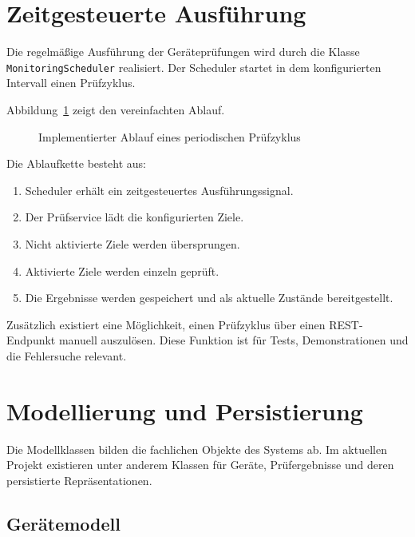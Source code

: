\section{Zeitgesteuerte Ausführung}
\label{sec:zeitgesteuerte-ausfuehrung}

Die regelmäßige Ausführung der Geräteprüfungen wird durch die Klasse \texttt{MonitoringScheduler} realisiert. Der Scheduler startet in dem konfigurierten Intervall einen Prüfzyklus.

Abbildung~\ref{fig:pruefzyklus-implementierung} zeigt den vereinfachten Ablauf.

\begin{figure}[htbp]
    \centering
    \caption{Implementierter Ablauf eines periodischen Prüfzyklus}
    \label{fig:pruefzyklus-implementierung}
\end{figure}

Die Ablaufkette besteht aus:

\begin{enumerate}
    \item Scheduler erhält ein zeitgesteuertes Ausführungssignal.
    \item Der Prüfservice lädt die konfigurierten Ziele.
    \item Nicht aktivierte Ziele werden übersprungen.
    \item Aktivierte Ziele werden einzeln geprüft.
    \item Die Ergebnisse werden gespeichert und als aktuelle Zustände bereitgestellt.
\end{enumerate}

Zusätzlich existiert eine Möglichkeit, einen Prüfzyklus über einen REST-Endpunkt manuell auszulösen. Diese Funktion ist für Tests, Demonstrationen und die Fehlersuche relevant.

\section{Modellierung und Persistierung}
\label{sec:modellierung-persistierung}

Die Modellklassen bilden die fachlichen Objekte des Systems ab. Im aktuellen Projekt existieren unter anderem Klassen für Geräte, Prüfergebnisse und deren persistierte Repräsentationen.

\subsection{Gerätemodell}
\label{subsec:geraetemodell}

